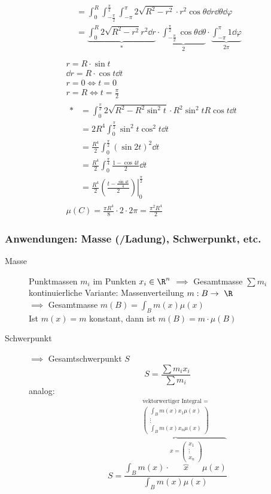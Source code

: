 \begin{bsp*}
\begin{gather*}
\begin{split}
				&= \int_0^R \int_{-\frac{\pi}{2}}^{\frac{\pi}{2}} \int_{-\pi}^\pi 2 \sqrt{R^2 - r^2} \cdot r^2 \cos \theta \dd r \dd \theta \dd \varphi \\
				&= \underbrace{\int_0^R 2 \sqrt{R^2 - r^2} r^2 \dd r}_{*} \cdot \underbrace{\int_{-\frac{\pi}{2}}^{\frac{\pi}{2}} \cos \theta \dd \theta}_{2} \cdot \underbrace{\int_{-\pi}^\pi 1 \dd \varphi}_{2\pi} \\
		\end{split} \\
		r = R \cdot \sin t \\ 
		\dd r = R \cdot \cos t \dd t \\
		r = 0 \iff t = 0 \\
		r = R \iff t = \frac{\pi}{2} \\
		\begin{split}
			*
				&= \int_0^{\frac{\pi}{2}} 2 \sqrt{R^2 - R^2 \sin^2 t} \cdot R^2 \sin^2 t R \cos t \dd t \\
				&= 2R^4 \int_0^{\frac{\pi}{2}} \sin^2 t \cos^2 t \dd t \\
				&= \frac{R^4}{2} \int_0^{\frac{\pi}{2}} (\sin 2t)^2 \dd t \\
				&= \frac{R^4}{2} \int_0^{\frac{\pi}{4}} \frac{1 - \cos 4t}{2} \dd t \\
				&= \frac{R^4}{2} \left. \left( \frac{t - \frac{\sin 4t}{4}}{2} \right) \right|_0^{\frac{\pi}{2}}
		\end{split} \\
		\mu(C) = \frac{\pi R^4}{8} \cdot 2 \cdot 2\pi = \frac{\pi^2 R^4}{2}
	\end{gather*}
\end{bsp*}

\subsubsection{Anwendungen: Masse (/Ladung), Schwerpunkt, etc.}
\begin{description}
	\item[Masse]
		Punktmassen $m_i$ im Punkten $x_i \in \R^n$ $\implies$ Gesamtmasse $\sum m_i$ \\
		kontinuierliche Variante: Massenverteilung $m: B \rightarrow \R$ \\
		$\implies$ Gesamtmasse $m(B) = \int_B m(x) \mu(x)$ \\
		Ist $m(x) = m$ konstant, dann ist $m(B) = m \cdot \mu(B)$
	\item[Schwerpunkt]
		$\implies$ Gesamtschwerpunkt $S$
		\[ S = \frac{\sum m_i x_i}{\sum m_i} \]
		analog:
		\[ S = \frac{\overbrace{\int_B m(x) \cdot \overbrace{x}^{x = \begin{pmatrix} x_1 \\ \vdots \\ x_n \end{pmatrix}} \mu(x)}^{\substack{\text{vektorwertiger Integral } = \\ \begin{pmatrix} \int_B m(x) x_1 \mu(x) \\ \vdots \\ \int_B m(x) x_n \mu(x) \end{pmatrix}}}}{\int_B m(x) \mu(x)} \]
\end{description}

